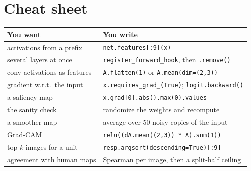 \documentclass[11pt]{article}
\begin{document}
\section*{Cheat sheet}

\begin{center}
\begin{tabular}{@{}p{}p{}@{}}
\toprule
\textbf{You want} & \textbf{You write} \\
\midrule
activations from a prefix     & \texttt{net.features[:9](x)} \\
several layers at once        & \texttt{register\_forward\_hook}, then \texttt{.remove()} \\
conv activations as features  & \texttt{A.flatten(1)} or \texttt{A.mean(dim=(2,3))} \\
gradient w.r.t.\ the input    & \texttt{x.requires\_grad\_(True)}; \texttt{logit.backward()} \\
a saliency map                & \texttt{x.grad[0].abs().max(0).values} \\
the sanity check              & randomize the weights and recompute \\
a smoother map                & average over 50 noisy copies of the input \\
Grad-CAM                      & \texttt{relu((dA.mean((2,3)) * A).sum(1))} \\
top-$k$ images for a unit     & \texttt{resp.argsort(descending=True)[:9]} \\
agreement with human maps     & Spearman per image, then a split-half ceiling \\
\bottomrule
\end{tabular}
\end{center}
\end{document}
